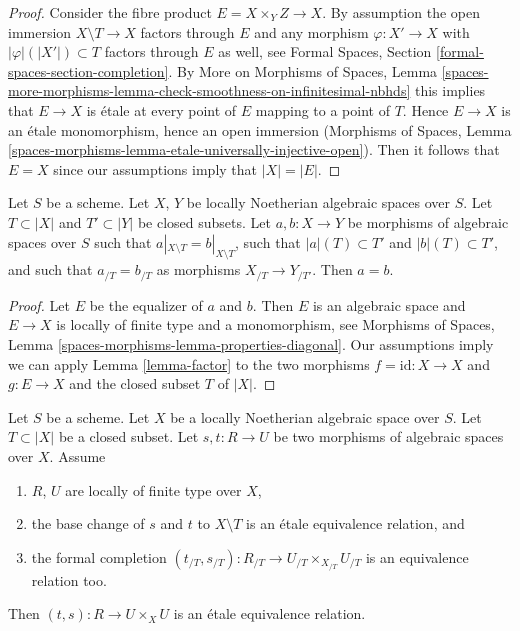 \begin{proof}
Consider the fibre product $E = X \times_Y Z \to X$.
By assumption the open immersion $X \setminus T \to X$
factors through $E$ and any morphism $\varphi : X' \to X$ with
$|\varphi|(|X'|) \subset T$ factors through $E$ as well, see
Formal Spaces, Section \ref{formal-spaces-section-completion}.
By More on Morphisms of Spaces, Lemma
\ref{spaces-more-morphisms-lemma-check-smoothness-on-infinitesimal-nbhds}
this implies that $E \to X$ is \'etale at every point of $E$
mapping to a point of $T$. Hence $E \to X$ is an \'etale
monomorphism, hence an open immersion
(Morphisms of Spaces, Lemma
\ref{spaces-morphisms-lemma-etale-universally-injective-open}).
Then it follows that $E = X$ since our assumptions imply that $|X| = |E|$.
\end{proof}

\begin{lemma}
\label{lemma-faithful}
Let $S$ be a scheme. Let $X$, $Y$ be locally Noetherian algebraic spaces
over $S$. Let $T \subset |X|$ and $T' \subset |Y|$ be closed subsets.
Let $a, b : X \to Y$ be morphisms of algebraic spaces over $S$ such
that $a|_{X \setminus T} = b|_{X \setminus T}$, such that
$|a|(T) \subset T'$ and $|b|(T) \subset T'$, and such that
$a_{/T} = b_{/T}$ as morphisms $X_{/T} \to Y_{/T'}$.
Then $a = b$.
\end{lemma}

\begin{proof}
Let $E$ be the equalizer of $a$ and $b$. Then $E$ is an algebraic space
and $E \to X$ is locally of finite type and a monomorphism, see
Morphisms of Spaces, Lemma \ref{spaces-morphisms-lemma-properties-diagonal}.
Our assumptions imply we can apply Lemma \ref{lemma-factor} to the two
morphisms $f = \text{id} : X \to X$ and $g : E \to X$ and the closed
subset $T$ of $|X|$.
\end{proof}

\begin{lemma}
\label{lemma-equivalence-relation}
Let $S$ be a scheme. Let $X$ be a locally Noetherian algebraic space
over $S$. Let $T \subset |X|$ be a closed subset.
Let $s, t : R \to U$ be two morphisms of algebraic spaces over $X$.
Assume
\begin{enumerate}
\item $R$, $U$ are locally of finite type over $X$,
\item the base change of $s$ and $t$ to $X \setminus T$
is an \'etale equivalence relation, and
\item the formal completion
$(t_{/T}, s_{/T}) : R_{/T} \to U_{/T} \times_{X_{/T}} U_{/T}$
is an equivalence relation too.
\end{enumerate}
Then $(t, s) : R \to U \times_X U$ is an \'etale equivalence relation.
\end{lemma}

